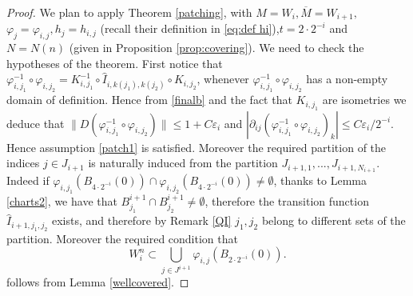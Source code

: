 \documentclass[11pt]{article}
\newcommand{\eps}{\varepsilon}
\renewcommand{\phi}{\varphi}
\theoremstyle{plain}
\theoremstyle{definition}
\numberwithin{equation}{section}
\begin{document}
\begin{proof}
	We plan to apply Theorem \ref{patching}, with $M=W_i,\overline{M}=W_{i+1},$	$\phi_j=\phi_{i,j},h_j=h_{i,j}$ (recall their definition in \eqref{eq:def hi}),$t=2\cdot 2^{-i}$ and $N=N(n)$ (given in Proposition \ref{prop:covering}). We need to check the hypotheses of the  theorem. First notice that $\phi_{i,j_1}^{-1}\circ \phi_{i,j_2}=K_{i,j_1}^{-1}\circ \hat I_{i,k(j_1),k(j_2)}\circ K_{i,j_2}$, whenever $\phi_{i,j_1}^{-1}\circ \phi_{i,j_2}$ has a non-empty domain of definition. Hence from \eqref{finalb} and the fact that $K_{i,j_1}$ are isometries we deduce that  $\|D(\phi_{i,j_1}^{-1}\circ \phi_{i,j_2})\|\le 1+C\eps_i$ and $|\partial_{ij}(\phi_{i,j_1}^{-1}\circ \phi_{i,j_2})_k|\le C\eps_i/2^{-i}$. Hence  assumption \eqref{patch1} is satisfied. Moreover the required partition of the indices $j\in J_{i+1}$ is naturally induced from the partition $J_{i+1,1},...,J_{i+1,N_{i+1}}$. Indeed if $\phi_{i,j_1}(B_{4\cdot 2^{-i}}(0))\cap \phi_{i,j_2}(B_{4\cdot 2^{-i}}(0))\neq \emptyset $, thanks to Lemma \ref{charts2}, we have that $B_{j_1}^{i+1}\cap B_{j_2}^{i+1}\neq \emptyset$, therefore the transition function $\hat I_{i+1,j_1,j_2}$ exists, and therefore by Remark \ref{QI} $j_1,j_2$ belong to different sets of the partition. Moreover the required condition that
	\begin{equation}\label{covered}
		W_{i}^n\subset \bigcup_{j\in J^{i+1}} \phi_{i,j}(B_{2\cdot 2^{-i}}(0)).
	\end{equation} 
	follows from Lemma \ref{wellcovered}.
	

\end{proof}
\end{document}

